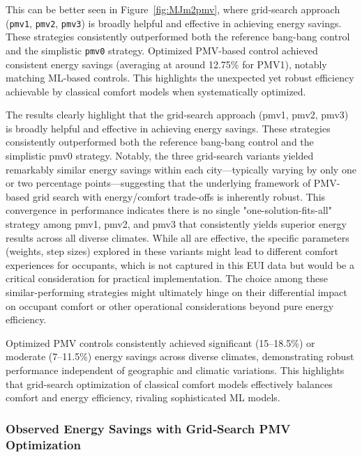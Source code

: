 This can be better seen in Figure~\ref{fig:MJm2pmv}, where grid-search approach (\texttt{pmv1}, \texttt{pmv2}, \texttt{pmv3}) is broadly helpful and effective in achieving energy savings. These strategies consistently outperformed both the reference bang-bang control and the simplistic \texttt{pmv0} strategy. Optimized PMV-based control achieved consistent energy savings (averaging at around 12.75\% for PMV1), notably matching ML-based controls. This highlights the unexpected yet robust efficiency achievable by classical comfort models when systematically optimized.

The results clearly highlight that the grid-search approach (pmv1, pmv2, pmv3) is broadly helpful and effective in achieving energy savings. These strategies consistently outperformed both the reference bang-bang control and the simplistic pmv0 strategy. Notably, the three grid-search variants yielded remarkably similar energy savings within each city—typically varying by only one or two percentage points—suggesting that the underlying framework of PMV-based grid search with energy/comfort trade-offs is inherently robust. This convergence in performance indicates there is no single "one-solution-fits-all" strategy among pmv1, pmv2, and pmv3 that consistently yields superior energy results across all diverse climates. While all are effective, the specific parameters (weights, step sizes) explored in these variants might lead to different comfort experiences for occupants, which is not captured in this EUI data but would be a critical consideration for practical implementation. The choice among these similar-performing strategies might ultimately hinge on their differential impact on occupant comfort or other operational considerations beyond pure energy efficiency.

Optimized PMV controls consistently achieved significant (15–18.5\%) or moderate (7–11.5\%) energy savings across diverse climates, demonstrating robust performance independent of geographic and climatic variations. This highlights that grid-search optimization of classical comfort models effectively balances comfort and energy efficiency, rivaling sophisticated ML models.

\subsubsection{Observed Energy Savings with Grid‐Search PMV Optimization}
\label{sec:pmv_energy}

